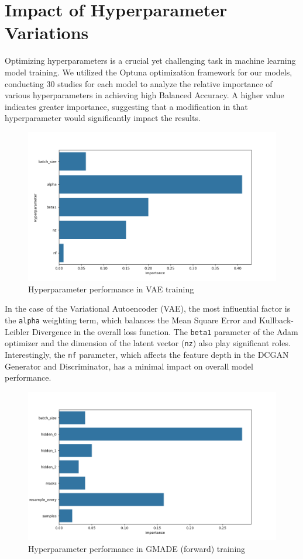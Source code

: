 \section{Impact of Hyperparameter Variations}
Optimizing hyperparameters is a crucial yet challenging task in machine learning model training. We utilized the Optuna optimization framework for our models, conducting 30 studies for each model to analyze the relative importance of various hyperparameters in achieving high Balanced Accuracy. A higher value indicates greater importance, suggesting that a modification in that hyperparameter would significantly impact the results.

\begin{figure}[h!]
    \includegraphics[width=\linewidth]{images/importances_vae}
    \caption{
    Hyperparameter performance in VAE training
}
\end{figure}

In the case of the Variational Autoencoder (VAE), the most influential factor is the \lstinline{alpha} weighting term, which balances the Mean Square Error and Kullback-Leibler Divergence in the overall loss function. The \lstinline{beta1} parameter of the Adam optimizer and the dimension of the latent vector (\lstinline{nz}) also play significant roles. Interestingly, the \lstinline{nf} parameter, which affects the feature depth in the DCGAN Generator and Discriminator, has a minimal impact on overall model performance.

\begin{figure}[h!]
    \includegraphics[width=\linewidth]{images/importances_gmade}
    \caption{
    Hyperparameter performance in GMADE (forward) training
}
\end{figure}

